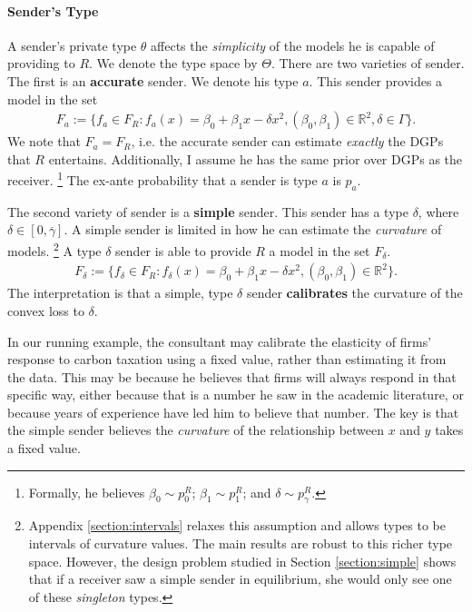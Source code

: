 \documentclass[11pt,dvipsnames]{article}
\begin{document}
\paragraph{Sender's Type}
A sender's private type $\theta$ affects the \emph{simplicity} of the models he is capable of providing to $R$.
We denote the type space by $\Theta$.
There are two varieties of sender.
The first is an \textbf{accurate} sender.
We denote his type $a$.
This sender provides a model in the set
\begin{align*}
F_a := \{f_a \in F_R : f_a(x) = \beta_0+\beta_1x - \delta x^2, (\beta_0,\beta_1) \in \mathbb{R}^2, \delta \in \Gamma \}.
\end{align*}
We note that $F_a = F_R$, i.e. the accurate sender can estimate \emph{exactly} the DGPs that $R$ entertains.
Additionally, I assume he has the same prior over DGPs as the receiver.
\footnote{Formally, he believes $\beta_0 \sim p_0^R$; $\beta_1 \sim p_1^R$; and $\delta \sim p_\gamma^R$.}
The ex-ante probability that a sender is type $a$ is $p_a$.

The second variety of sender is a \textbf{simple} sender.
This sender has a type $\delta$, where $\delta \in [0,\overline{\gamma}]$.
A simple sender is limited in how he can estimate the \emph{curvature} of models.
\footnote{Appendix \ref{section:intervals} relaxes this assumption and allows types to be intervals of curvature values. The main results are robust to this richer type space. However, the design problem studied in Section \ref{section:simple} shows that if a receiver saw a simple sender in equilibrium, she would only see one of these \emph{singleton} types.}
A type $\delta$ sender is able to provide $R$ a model in the set $F_{\delta}$.
\begin{align*}
F_{\delta} := \{f_\delta \in F_R : f_\delta(x) = \beta_0+\beta_1x - \delta x^2, (\beta_0,\beta_1) \in \mathbb{R}^2 \}.
\end{align*}
The interpretation is that a simple, type $\delta$ sender \textbf{calibrates} the curvature of the convex loss to $\delta$.

In our running example, the consultant may calibrate the elasticity of firms' response to carbon taxation using a fixed value, rather than estimating it from the data.
 This may be because he believes that firms will always respond in that specific way, either because that is a number he saw in the academic literature, or because years of experience have led him to believe that number.
 The key is that the simple sender believes the \emph{curvature} of the relationship between $x$ and $y$ takes a fixed value.
 
\end{document}
